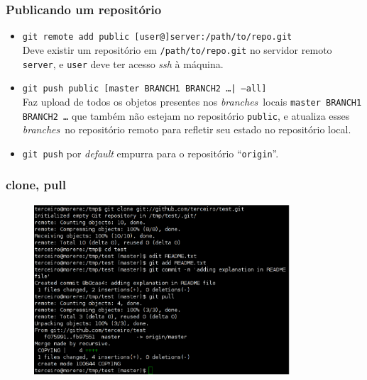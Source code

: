 \documentclass{beamer}
\newcommand{\branches}{\emph{branches}}
\begin{document}
\begin{frame}
  \frametitle{Publicando um repositório}
  \pause
  \begin{itemize}
    \item \texttt{git remote add public [user@]server:/path/to/repo.git}
      \\
      Deve existir um repositório em \texttt{/path/to/repo.git} no
      servidor remoto \texttt{server}, e \texttt{user} deve ter acesso
      \emph{ssh} à máquina.
      \pause

    \item \texttt{git push public [master BRANCH1 BRANCH2 \ldots| --all]}
      \\
      Faz upload de todos os objetos presentes nos \branches\ locais
      \texttt{master BRANCH1 BRANCH2 \ldots} que também não estejam no
      repositório \texttt{public}, e atualiza esses \branches\ no
      repositório remoto para refletir seu estado no repositório local.
      \pause

    \item \texttt{git push} por \emph{default} empurra para o
      repositório ``\texttt{origin}''. 
  \end{itemize}
\end{frame}

\begin{frame}
  \frametitle{clone, pull}
  \begin{figure}[h]
    \begin{center}
      \includegraphics[width=0.85\textwidth]{figs/git-screenshot-clone-pull.eps}
    \end{center}
    \label{fig:git-clone-pull}
  \end{figure}
\end{frame}
\end{document}
